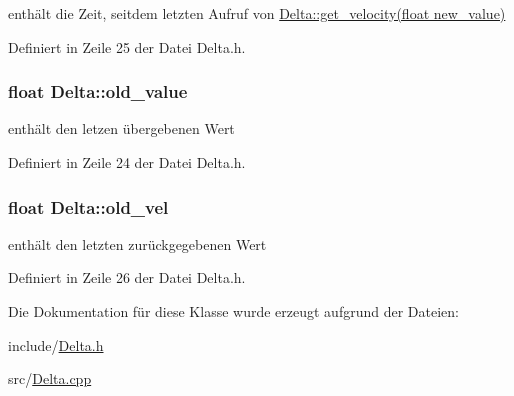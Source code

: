 enthält die Zeit, seitdem letzten Aufruf von \hyperlink{class_delta_a16d1cf25743928796d7cf1e5c7882c17}{Delta::get\_\-velocity(float new\_\-value)} 



Definiert in Zeile 25 der Datei Delta.h.

\hypertarget{class_delta_a1724264763801016d7d1c0d5f4817a96}{
\subsubsection[{old\_\-value}]{\setlength{\rightskip}{0pt plus 5cm}float {\bf Delta::old\_\-value}}}
\label{class_delta_a1724264763801016d7d1c0d5f4817a96}


enthält den letzen übergebenen Wert 



Definiert in Zeile 24 der Datei Delta.h.

\hypertarget{class_delta_a479029e6db0f2738547961f0d72bec78}{
\subsubsection[{old\_\-vel}]{\setlength{\rightskip}{0pt plus 5cm}float {\bf Delta::old\_\-vel}}}
\label{class_delta_a479029e6db0f2738547961f0d72bec78}


enthält den letzten zurückgegebenen Wert 



Definiert in Zeile 26 der Datei Delta.h.



Die Dokumentation für diese Klasse wurde erzeugt aufgrund der Dateien:\begin{DoxyCompactItemize}
\item 
include/\hyperlink{_delta_8h}{Delta.h}\item 
src/\hyperlink{_delta_8cpp}{Delta.cpp}\end{DoxyCompactItemize}
